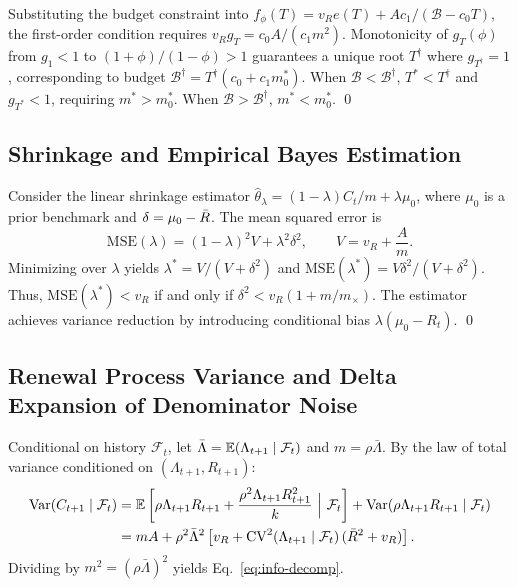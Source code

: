 Substituting the budget constraint into $f_\phi(T) = v_R e(T) + A c_1 / (\mathcal{B} - c_0 T)$, the first-order condition requires $v_R g_T = c_0 A / (c_1 m^2)$. Monotonicity of $g_T(\phi)$ from $g_1 < 1$ to $(1+\phi)/(1-\phi) > 1$ guarantees a unique root $T^\dagger$ where $g_{T^\dagger} = 1$, corresponding to budget $\mathcal{B}^\dagger = T^\dagger(c_0 + c_1 m_0^*)$. When $\mathcal{B} < \mathcal{B}^\dagger$, $T^* < T^\dagger$ and $g_{T^*} < 1$, requiring $m^* > m_0^*$. When $\mathcal{B} > \mathcal{B}^\dagger$, $m^* < m_0^*$. \qed

\subsection{Shrinkage and Empirical Bayes Estimation}
\label{sec:proof-shrink}

Consider the linear shrinkage estimator $\hat{\theta}_\lambda = (1-\lambda)C_t/m + \lambda\mu_0$, where $\mu_0$ is a prior benchmark and $\delta = \mu_0 - \bar{R}$. The mean squared error is
\begin{equation}
  \mathrm{MSE}(\lambda) = (1-\lambda)^2 V + \lambda^2 \delta^2, \qquad V = v_R + \frac{A}{m}.
\end{equation}
Minimizing over $\lambda$ yields $\lambda^* = V/(V+\delta^2)$ and $\mathrm{MSE}(\lambda^*) = V\delta^2 / (V+\delta^2)$. Thus, $\mathrm{MSE}(\lambda^*) < v_R$ if and only if $\delta^2 < v_R(1 + m/m_\times)$. The estimator achieves variance reduction by introducing conditional bias $\lambda(\mu_0 - R_t)$. \qed

\subsection{Renewal Process Variance and Delta Expansion of Denominator Noise}
\label{sec:proof-renewal}

Conditional on history $\mathcal{F}_t$, let $\bar{\Lambda} = \mathbb{E}(\Lambda_{t+1} \mid \mathcal{F}_t)$ and $m = \rho \bar{\Lambda}$. By the law of total variance conditioned on $(\Lambda_{t+1}, R_{t+1})$:
\begin{align}
  \Var(C_{t+1} \mid \mathcal{F}_t) &= \E\left[\rho \Lambda_{t+1} R_{t+1} + \frac{\rho^2 \Lambda_{t+1} R_{t+1}^2}{k}\ \Big|\ \mathcal{F}_t\right] + \Var(\rho \Lambda_{t+1} R_{t+1} \mid \mathcal{F}_t) \nonumber \\
  &= m A + \rho^2 \bar{\Lambda}^2 \left[v_R + \CV^2(\Lambda_{t+1} \mid \mathcal{F}_t)\,(\Rbar^2 + v_R)\right].
\end{align}
Dividing by $m^2 = (\rho \bar{\Lambda})^2$ yields Eq.~\eqref{eq:info-decomp}.

